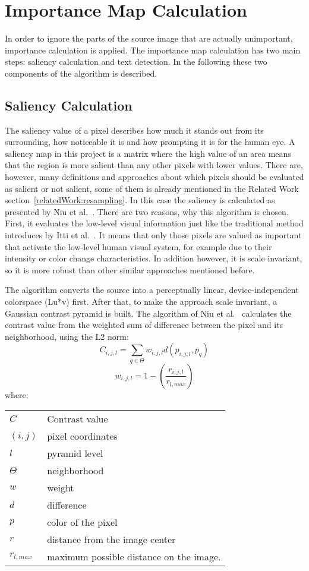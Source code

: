 \documentclass[draft,final]{vutinfth} %
\makeatletter
\newenvironment{conditions}
{\par\vspace{\abovedisplayskip}\noindent\begin{tabular}{>{$}l<{$} @{${}:{}$} l}}
	{\end{tabular}\par\vspace{\belowdisplayskip}}
\makeatother
\begin{document}
	\section{Importance Map Calculation}
	In order to ignore the parts of the source image that are actually unimportant, importance calculation is applied.
	The importance map calculation has two main steps: saliency calculation and text detection.
	In the following these two components of the algorithm is described.
	\subsection{Saliency Calculation}
	\label{saliencyCalculation}
	The saliency value of a pixel describes how much it stands out from its surrounding, how noticeable it is and how prompting it is for the human eye.
	A saliency map in this project is a matrix where the high value of an area means that the region is more salient than any other pixels with lower values.
	There are, however, many definitions and approaches about which pixels should be evaluated as salient or not salient, some of them is already mentioned in the Related Work section~\ref{relatedWork:resampling}.
	In this case the saliency is calculated as presented by Niu et al.~\cite{niu2012image}. 
	There are two reasons, why this algorithm is chosen.
	First, it evaluates the low-level visual information just like the traditional method introduces by Itti et al.~\cite{itti1998model}.
	It means that only those pixels are valued as important that activate the low-level human visual system, for example due to their intensity or color change characteristics.
	In addition however, it is scale invariant, so it is more robust than other similar approaches mentioned before.\par 
	The algorithm converts the source into a perceptually linear, device-independent colorspace (Lu*v) first.
	After that, to make the approach scale invariant, a Gaussian contrast pyramid is built.
	The algorithm of Niu et al.~\cite{niu2012image} calculates the contrast value from the weighted sum of difference between the pixel and its neighborhood, using the L2 norm:
	\[ C_{i,j,l}=\sum\limits_{q\in\Theta}w_{i,j,l}d(p_{i,j,l},p_{q}) \]
	\[ w_{i,j,l}=1-\left(\frac{r_{i,j,l}}{r_{l,max}}\right) \]
	where:
	\begin{center}
		\begin{conditions}
			C & Contrast value \\
			(i, j) & pixel coordinates \\
			l & pyramid level \\
			\Theta & neighborhood \\
			w & weight \\
			d & difference \\
			p & color of the pixel \\
			r & distance from the image center \\
			r_{l, max} & maximum possible distance on the image.
		\end{conditions}
	\end{center}
\end{document}
